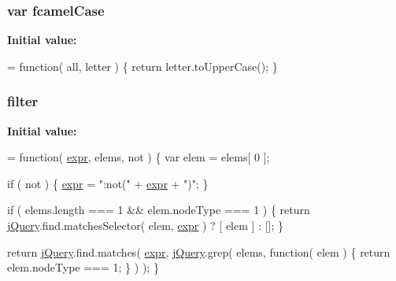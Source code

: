 \subsubsection[{\texorpdfstring{fcamel\+Case}{fcamelCase}}]{\setlength{\rightskip}{0pt plus 5cm}var fcamel\+Case}\hypertarget{jquery-3_82_81_8js_a557c2142f8ded6728ea9eb2736b16cd8}{}\label{jquery-3_82_81_8js_a557c2142f8ded6728ea9eb2736b16cd8}
{\bfseries Initial value\+:}
\begin{DoxyCode}
= \textcolor{keyword}{function}( all, letter ) \{
        \textcolor{keywordflow}{return} letter.toUpperCase();
    \}
\end{DoxyCode}
\subsubsection[{\texorpdfstring{filter}{filter}}]{ filter}\hypertarget{jquery-3_82_81_8js_a416d078c0ae6e311bcc3867bd87ed2e4}{}\label{jquery-3_82_81_8js_a416d078c0ae6e311bcc3867bd87ed2e4}
{\bfseries Initial value\+:}
\begin{DoxyCode}
= \textcolor{keyword}{function}( \hyperlink{jquery-3_82_81_8js_aaacd1d5b3593ba4dfff6d67d4f6cfda1}{expr}, elems, not ) \{
    var elem = elems[ 0 ];

    \textcolor{keywordflow}{if} ( not ) \{
        \hyperlink{jquery-3_82_81_8js_aaacd1d5b3593ba4dfff6d67d4f6cfda1}{expr} = \textcolor{stringliteral}{":not("} + \hyperlink{jquery-3_82_81_8js_aaacd1d5b3593ba4dfff6d67d4f6cfda1}{expr} + \textcolor{stringliteral}{")"};
    \}

    \textcolor{keywordflow}{if} ( elems.length === 1 && elem.nodeType === 1 ) \{
        \textcolor{keywordflow}{return} \hyperlink{jquery-3_82_81_8js_a609525712f1102566c2b03866ceb2bba}{jQuery}.find.matchesSelector( elem, \hyperlink{jquery-3_82_81_8js_aaacd1d5b3593ba4dfff6d67d4f6cfda1}{expr} ) ? [ elem ] : [];
    \}

    \textcolor{keywordflow}{return} \hyperlink{jquery-3_82_81_8js_a609525712f1102566c2b03866ceb2bba}{jQuery}.find.matches( \hyperlink{jquery-3_82_81_8js_aaacd1d5b3593ba4dfff6d67d4f6cfda1}{expr}, \hyperlink{jquery-3_82_81_8js_a609525712f1102566c2b03866ceb2bba}{jQuery}.grep( elems, \textcolor{keyword}{function}( elem ) \{
        return elem.nodeType === 1;
    \} ) );
\}
\end{DoxyCode}
